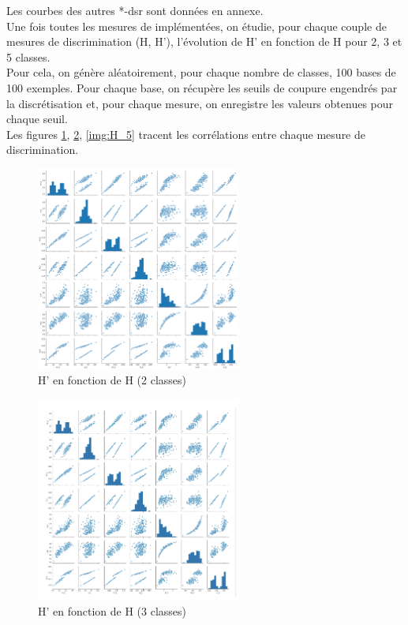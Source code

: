 \documentclass[a4paper]{article}
\begin{document}
Les courbes des autres *-dsr sont données en annexe.\\

Une fois toutes les mesures de \cite{marsala-rank} implémentées, on étudie, pour
chaque couple de mesures de discrimination (H, H'), l'évolution de H' en
fonction de H pour 2, 3 et 5 classes. \\
Pour cela, on génère aléatoirement, pour chaque nombre de classes, 100 bases de
100 exemples. Pour chaque base, on récupère les seuils de coupure engendrés par
la discrétisation et, pour chaque mesure, on enregistre les valeurs obtenues
pour chaque seuil.\\
Les figures \ref{img:H_2}, \ref{img:H_3}, \ref{img:H_5} tracent les corrélations
entre chaque mesure de discrimination. \\

\begin{figure}[H]
	\center 
	\includegraphics[width=0.6\textwidth]{images/H_2.png}
    \caption{H' en fonction de H (2 classes)}
    \label{img:H_2}
\end{figure}

\begin{figure}[H]

	\center 
	\includegraphics[width=0.6\textwidth]{images/H_3.png}
    \caption{H' en fonction de H (3 classes)}
    \label{img:H_3}
\end{figure}
\end{document}

